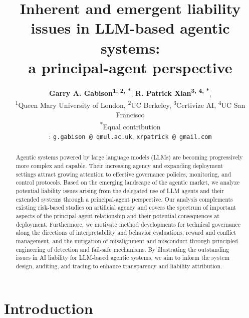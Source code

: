 \documentclass[11pt]{article}
\title{Inherent and emergent liability issues in LLM-based agentic systems:\\ a principal-agent perspective}
\author{
 \textbf{Garry A. Gabison\textsuperscript{1, 2, *}},
 \textbf{R. Patrick Xian\textsuperscript{3, 4, *}},
\\
 \textsuperscript{1}Queen Mary University of London,
 \textsuperscript{2}UC Berkeley,
 \textsuperscript{3}Certivize AI,
 \textsuperscript{4}UC San Francisco
\\
 \textsuperscript{*}Equal contribution
\\
 \normalsize{
   \Letter: \texttt{g.gabison\,@\,qmul.ac.uk}, \texttt{xrpatrick\,@\,gmail.com}
 }
}
\begin{document}
\maketitle
\begin{abstract}
Agentic systems powered by large language models (LLMs) are becoming progressively more complex and capable. Their increasing agency and expanding deployment settings attract growing attention to effective governance policies, monitoring, and control protocols. Based on the emerging landscape of the agentic market, we analyze potential liability issues arising from the delegated use of LLM agents and their extended systems through a principal-agent perspective. Our analysis complements existing risk-based studies on artificial agency and covers the spectrum of important aspects of the principal-agent relationship and their potential consequences at deployment. Furthermore, we motivate method developments for technical governance along the directions of interpretability and behavior evaluations, reward and conflict management, and the mitigation of misalignment and misconduct through principled engineering of detection and fail-safe mechanisms. By illustrating the outstanding issues in AI liability for LLM-based agentic systems, we aim to inform the system design, auditing, and tracing to enhance transparency and liability attribution.
\end{abstract}

\section{Introduction}
\label{sec:intro}



\end{document}
